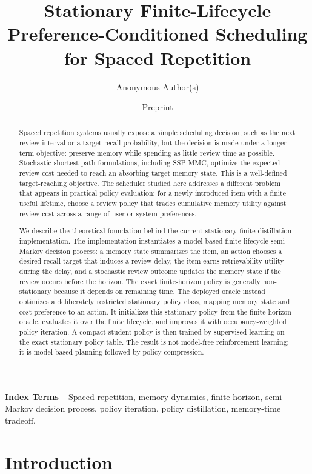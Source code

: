 \documentclass[11pt]{article}
\title{Stationary Finite-Lifecycle Preference-Conditioned Scheduling for Spaced Repetition}
\author{Anonymous Author(s)}
\date{Preprint}
\begin{document}
\maketitle

\begin{abstract}
Spaced repetition systems usually expose a simple scheduling decision, such as the next review interval or a target recall probability, but the decision is made under a longer-term objective: preserve memory while spending as little review time as possible. Stochastic shortest path formulations, including SSP-MMC, optimize the expected review cost needed to reach an absorbing target memory state. This is a well-defined target-reaching objective. The scheduler studied here addresses a different problem that appears in practical policy evaluation: for a newly introduced item with a finite useful lifetime, choose a review policy that trades cumulative memory utility against review cost across a range of user or system preferences.

We describe the theoretical foundation behind the current stationary finite distillation implementation. The implementation instantiates a model-based finite-lifecycle semi-Markov decision process: a memory state summarizes the item, an action chooses a desired-recall target that induces a review delay, the item earns retrievability utility during the delay, and a stochastic review outcome updates the memory state if the review occurs before the horizon. The exact finite-horizon policy is generally non-stationary because it depends on remaining time. The deployed oracle instead optimizes a deliberately restricted stationary policy class, mapping memory state and cost preference to an action. It initializes this stationary policy from the finite-horizon oracle, evaluates it over the finite lifecycle, and improves it with occupancy-weighted policy iteration. A compact student policy is then trained by supervised learning on the exact stationary policy table. The result is not model-free reinforcement learning; it is model-based planning followed by policy compression.
\end{abstract}

\noindent\textbf{Index Terms---}Spaced repetition, memory dynamics, finite horizon, semi-Markov decision process, policy iteration, policy distillation, memory-time tradeoff.

\section{Introduction}
\end{document}
